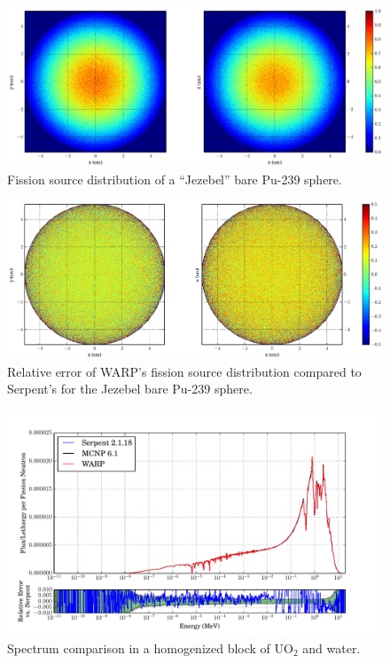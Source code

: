 \begin{figure}[h!]
\centering
\includegraphics[width=\textwidth,trim= 5cm 0cm 7cm 0cm]{graphics/finalresults/godiva_fiss-6.eps}
\caption{Fission source distribution of a ``Jezebel'' bare Pu-239 sphere. \label{godiva_fiss} }
\end{figure}

\begin{figure}[h!]
\centering
\includegraphics[width=\textwidth,trim= 5cm 0cm 7cm 0cm]{graphics/finalresults/godiva_fiss_diff-6.eps}
\caption{Relative error of WARP's fission source distribution compared to Serpent's for the Jezebel bare Pu-239 sphere. \label{godiva_fiss_diff} }
\end{figure}

\begin{figure}[h!] 
\centering
\includegraphics[width=\textwidth,trim= 1cm 0cm 1cm 0cm]{graphics/finalresults/homfuel_spec-6.pdf}
\caption{Spectrum comparison in a homogenized block of UO$_2$ and water. \label{homfuel_spec} }
\end{figure}


